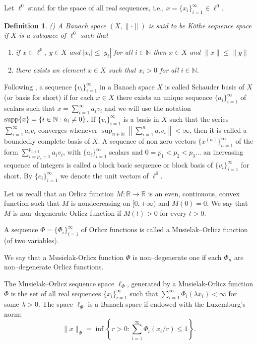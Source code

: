 \documentclass[12pt]{article}
\theoremstyle{thmstyleone}%
\theoremstyle{thmstyletwo}%
\theoremstyle{thmstylethree}%
\newtheorem{definition}{Definition}%
\begin{document}
Let
$\ell^0$ stand for the space of all real sequences, i.e.,
$x=\{x_i\}_{i=1}^\infty\in\ell^0$.

\begin{definition}\label{definition:8}(\cite{Cui-Hudzik})
	A Banach space $(X,\|\cdot\|)$ is said to be K\"othe sequence
	space if $X$ is a subspace of $\ell^0$ such that
	\begin{enumerate}[label=(d\ref{definition:8}.\roman*)]
		\item\label{lab:d5-1}if $x\in\ell^0$, $y\in X$ and $|x_i|\leq |y_i|$ for all $i\in\mathbb{N}$
		then $x\in X$ and $\|x\|\le\|y\|$
		\item\label{lab:d5-1}there exists an element $x\in X$ such that $x_i>0$ for all
		$i\in\mathbb{N}$.
	\end{enumerate}
\end{definition}

Following \cite{Lindenstrauss-Tzafriri}, a sequence $\{v_i\}_{i=1}^\infty$ in a Banach space $X$ is called
Schauder basis of $X$ (or basis for short) if for each $x\in X$
there exists an unique sequence $\{a_i\}_{i=1}^\infty$ of scalars
such that $x=\displaystyle\sum_{i=1}^\infty a_iv_i$ and we will use the notation ${\rm supp}\{x\}=\{i\in\mathbb{N}:a_i\not= 0\}$. If
$\{v_i\}_{i=1}^\infty$ is a basis in $X$ such that the series
$\displaystyle\sum_{i=1}^\infty a_iv_i$ converges whenever
$\displaystyle\sup_{n\in\mathbb{N}}\left\|\displaystyle\sum_{i=1}^n a_iv_i\right\|<\infty$,
then it is called a boundedly complete basis of $X$. A sequence of
non zero vectors $\{x^{(n)}\}_{n=1}^\infty$ of the form
$\displaystyle\sum_{i=p_n+1}^{p_{n+1}}a_iv_i$, with $\{a_i\}_{i=1}^\infty$
scalars and $0=p_1<p_2<p_3\dots$ an increasing sequence of
integers is called a block basic sequence or block basis of
$\{v_i\}_{i=1}^\infty$ for short. By $\{e_i\}_{i=1}^\infty$ we
denote the unit vectors of $\ell^0$.

Let us recall that an Orlicz function $M:\mathbb{R}\to\mathbb{R}$ is an even, continuous, convex function
such that $M$ is nondecreasing on $[0,+\infty)$ and $M(0)=0$. We say that $M$
is non--degenerate Orlicz function if $M(t)>0$ for every $t>0$. 

A sequence $\Phi =\{\Phi_{i}\}_{i=1}^\infty$ of Orlicz functions is
called a Musielak--Orlicz function (of two variables).

 We say that a Musielak-Orlicz function $\Phi$
is non--degenerate one if each $\Phi_n$ are non--degenerate Orlicz functions.

The Musielak--Orlicz sequence space $\ell_\Phi$, generated by a Musielak-Orlicz function $\Phi$
is the set of all real sequences $\{x_i\}_{i=1}^\infty$ such that
$\sum_{i=1}^\infty\Phi_i(\lambda x_i)<\infty$ for some $\lambda >0$.
The space $\ell_\Phi$ is a Banach space if endowed with
the Luxemburg's norm:
$$
\| x\|_{\Phi} =\inf\left\{
r>0:\sum_{i=1}^\infty\Phi_{i}(x_i/r)\leq 1\right\}.
$$
\end{document}
